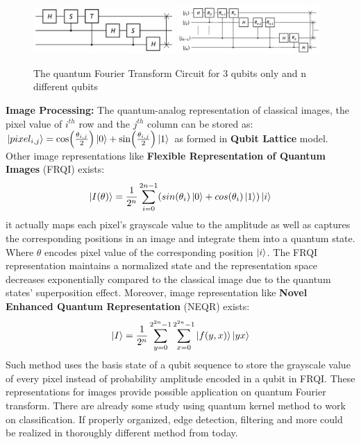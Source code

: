 \documentclass{article}
\begin{document}
\begin{figure}[h]
  \includegraphics[width=0.48\textwidth]{qft2.png}
  \includegraphics[width=0.48\textwidth]{qft1.png}
  \caption{The quantum Fourier Transform Circuit for 3 qubits only and 
  n different qubits}
\end{figure}

\textbf{Image Processing:} The quantum-analog representation of classical images, the pixel value 
of $i^{th}$ row and the $j^{th}$ column can be stored as:
$\ket{pixel_{i,j}} = \cos(\frac{\theta_{i,j}}{2}) \ket{0} + 
\sin (\frac{\theta_{i,j}}{2}) \ket{1}$ as formed in \textbf{Qubit Lattice} model.
Other image representations like \textbf{Flexible Representation of 
Quantum Images} (FRQI) exists: 
\begin{equation}
  \ket{I(\theta)} = \frac{1}{2^n} \sum_{i=0}^{2n-1} (sin(\theta_i) \ket{0} + cos(\theta_i)\ket{1}) \ket{i}
\end{equation}
it actually maps each pixel's grayscale value to the amplitude as well as 
captures the corresponding positions in an image and integrate them into 
a quantum state. Where $\theta$ encodes pixel value of the corresponding 
position $\ket{i}$. The FRQI representation maintains a normalized state 
and the representation space decreases exponentially compared to the 
classical image due to the quantum states' superposition effect. 
Moreover, image representation like \textbf{Novel Enhanced Quantum Representation} (NEQR) exists:
\begin{equation}
  \ket{I} = \frac{1}{2^n} \sum^{2^{2n} -1 }_{y=0} \sum^{2^{2n} -1 }_{x=0} \ket{f(y,x)} \ket{y x}
\end{equation}
Such method uses the basis state of a qubit sequence to 
store the grayscale value of every pixel instead of 
probability amplitude encoded in a qubit in FRQI. 
These representations for images provide possible application on 
quantum Fourier transform. There are already some study using quantum kernel 
method to work on classification. If properly organized, edge detection, filtering 
and more could be realized in thoroughly different method from today.
\end{document}
